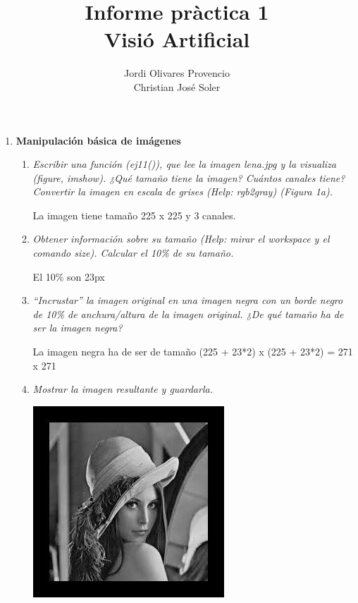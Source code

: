 \documentclass[a4paper,10pt]{article}
\title{Informe pràctica 1\\Visió Artificial}
\author{Jordi Olivares Provencio\\Christian José Soler}
\begin{document}
\maketitle
 
\begin{enumerate}
 
 \item \textbf{Manipulación básica de imágenes}
 
 \begin{enumerate}
 
 \item \textit{Escribir una función (ej11()), que lee la imagen lena.jpg y la visualiza (figure, 
imshow). ¿Qué tamaño tiene la imagen? Cuántos canales tiene? Convertir la 
imagen en escala de grises (Help: rgb2gray) (Figura 1a). }
 
 La imagen tiene tamaño 225 x 225 y 3 canales.
 
 \item \textit{Obtener información sobre su tamaño (Help: mirar el workspace y el comando 
size). Calcular el 10\% de su tamaño.}
 
 El 10\% son 23px
 
 \item \textit{“Incrustar” la imagen original en una imagen negra con un borde negro de 
10\% de anchura/altura de la imagen original. ¿De qué tamaño ha de ser la 
imagen negra?}

 La imagen negra ha de ser de tamaño (225 + 23*2) x (225 + 23*2) = 271 x 271

 \item \textit{Mostrar la imagen resultante y guardarla.}

 \begin{center}
 \includegraphics[scale=0.5]{lena_frame} 
 \end{center}
 

\end{enumerate}
\end{enumerate}
\end{document}
